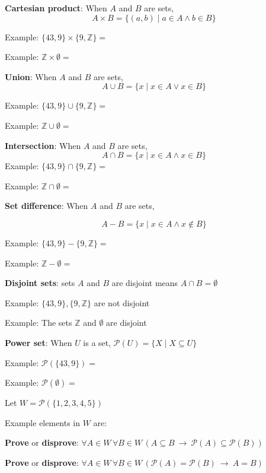 \documentclass[12pt, oneside]{article}
\begin{document}
{\bf Cartesian product}: When $A$ and  $B$ are sets, 
\[
    A \times  B = \{ (a,b) \mid a \in A  \wedge b  \in B \}
\]

Example: $\{43, 9\} \times  \{9, \mathbb{Z}\}  = $
    
Example: $\mathbb{Z} \times \emptyset  = $

{\bf Union}: When $A$ and  $B$ are sets,
\[
    A \cup  B = \{ x \mid x \in A  \vee x \in B \}
\]    
    
Example: $\{43, 9\} \cup \{9, \mathbb{Z}\}  = $

Example: $\mathbb{Z} \cup \emptyset  = $ 

{\bf Intersection}: When $A$ and  $B$ are sets,
\[
    A \cap  B = \{ x \mid x \in A  \wedge x \in B \}
\]    
Example: $\{43, 9\} \cap \{9,\mathbb{Z}\}  = $

Example: $\mathbb{Z} \cap \emptyset  = $


{\bf Set  difference}: When $A$ and  $B$ are sets,

\[
    A -  B = \{ x \mid x \in A  \wedge x \notin B \}
\]

Example: $\{43, 9\} - \{9, \mathbb{Z}\}  = $

Example: $\mathbb{Z} - \emptyset  = $

    
{\bf Disjoint sets}: sets $A$ and  $B$ are disjoint means $A \cap  B  = \emptyset$

Example: $\{43, 9\}, \{9, \mathbb{Z}\}$ are not  disjoint 

Example: The sets $\mathbb{Z}$ and $\emptyset$ are disjoint

    

{\bf Power set}: When $U$ is a set, $\mathcal{P}(U) = \{ X \mid X \subseteq U\}$

Example: $\mathcal{P}(\{43, 9\}) = $

Example: $\mathcal{P}(\emptyset) = $
 
\newpage


Let $W =  \mathcal{P}(  \{ 1,2,3,4,5\} )$

Example elements in $W$ are:
\vspace{20pt}


{\bf Prove} or {\bf  disprove}:  $\forall  A \in W\,  \forall B \in W\,  \left( A \subseteq B
~\to ~ \mathcal{P}(A) \subseteq \mathcal{P}(B) \right)$

\vfill
\vfill
\vfill

{\bf Prove} or {\bf  disprove}:  $\forall  A \in W\,  \forall B \in W\,  \left( \mathcal{P}(A)  =\mathcal{P}(B)
~\to ~ A = B \right)$
\end{document}
